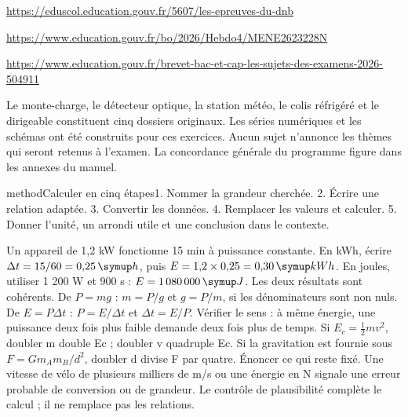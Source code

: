 {\small\url{https://eduscol.education.gouv.fr/5607/les-epreuves-du-dnb}\par
\url{https://www.education.gouv.fr/bo/2026/Hebdo4/MENE2623228N}\par
\url{https://www.education.gouv.fr/brevet-bac-et-cap-les-sujets-des-examens-2026-504911}\par}
Le monte-charge, le détecteur optique, la station météo, le colis réfrigéré et le dirigeable constituent cinq dossiers originaux. Les séries numériques et les schémas ont été construits pour ces exercices. Aucun sujet n’annonce les thèmes qui seront retenus à l’examen. La concordance générale du programme figure dans les annexes du manuel.
\label{methodes}
\begin{pcEncadre}{method}{Calculer en cinq étapes}1. Nommer la grandeur cherchée. 2. Écrire une relation adaptée. 3. Convertir les données. 4. Remplacer les valeurs et calculer. 5. Donner l’unité, un arrondi utile et une conclusion dans le contexte.\end{pcEncadre}
Un appareil de 1,2 kW fonctionne 15 min à puissance constante. En kWh, écrire $\Delta t=15/60=0{,}25\unite h$, puis $E=1{,}2\times0{,}25=0{,}30\unite{kWh}$. En joules, utiliser 1 200 W et 900 s : $E=1\,080\,000\unite J$. Les deux résultats sont cohérents.
De $P=mg$ : $m=P/g$ et $g=P/m$, si les dénominateurs sont non nuls. De $E=P\Delta t$ : $P=E/\Delta t$ et $\Delta t=E/P$. Vérifier le sens : à même énergie, une puissance deux fois plus faible demande deux fois plus de temps.
Si $E_c=\tfrac12mv^2$, doubler m double Ec ; doubler v quadruple Ec. Si la gravitation est fournie sous $F=Gm_Am_B/d^2$, doubler d divise F par quatre. Énoncer ce qui reste fixé.
Une vitesse de vélo de plusieurs milliers de m/s ou une énergie en N signale une erreur probable de conversion ou de grandeur. Le contrôle de plausibilité complète le calcul ; il ne remplace pas les relations.
\label{formules}
\begingroup\renewcommand{\arraystretch}{1.5}\fontsize{10.5}{13}\selectfont
